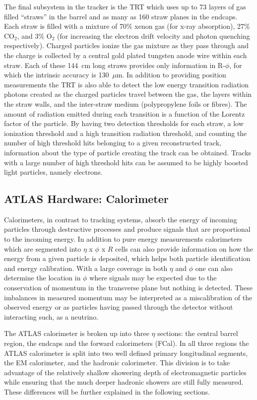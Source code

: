 The final subsystem in the tracker is the TRT which uses up to 73 layers of gas filled ``straws'' in the barrel and as many as 160 straw planes in the endcaps.  
Each straw is filled with a mixture of 70\% xenon gas (for x-ray absorption), 27\% CO$_2$, and 3\% O$_2$ (for increasing the electron drift velocity and photon quenching respectively).  
Charged particles ionize the gas mixture as they pass through and the charge is collected by a central gold plated tungsten anode wire within each straw.  
Each of these 144~cm long straws provides only information in R-$\phi$, for which the intrinsic accuracy is 130~$\mu$m.  
In addition to providing position measurements the TRT is also able to detect the low energy transition radiation photons created as the charged particles travel between the gas, the layers within the straw walls, and the inter-straw medium (polypropylene foils or fibres).  
The amount of radiation emitted during each transition is a function of the Lorentz factor of the particle.  
By having two detection thresholds for each straw, a low ionization threshold and a high transition radiation threshold, and counting the number of high threshold hits belonging to a given reconstructed track, information about the type of particle creating the track can be obtained.  
Tracks with a large number of high threshold hits can be assumed to be highly boosted light particles, namely electrons.  

\subsection{ATLAS Hardware: Calorimeter}
Calorimeters, in contrast to tracking systems, absorb the energy of incoming particles through destructive processes and produce signals that are proportional to the incoming energy.  
In addition to pure energy measurements calorimeters which are segmented into $\eta$ x $\phi$ x $R$ cells can also provide information on how the energy from a given particle is deposited, which helps both particle identification and energy calibration.  
With a large coverage in both $\eta$ and $\phi$ one can also determine the location in $\phi$ where signals may be expected due to the conservation of momentum in the transverse plane but nothing is detected.  
These imbalances in measured momentum may be interpreted as a miscalibration of the observed energy or as particles having passed through the detector without interacting such, as a neutrino.

The ATLAS calorimeter is broken up into three $\eta$ sections: the central barrel region, the endcaps and the forward calorimeters (FCal).  
In all three regions the ATLAS calorimeter is split into two well defined primary longitudinal segments, the \gls{EM} calorimeter, and the hadronic calorimeter.   
This division is to take advantage of the relatively shallow showering depth of electromagnetic particles while ensuring that the much deeper hadronic showers are still fully measured.  
These differences will be further explained in the following sections.  

